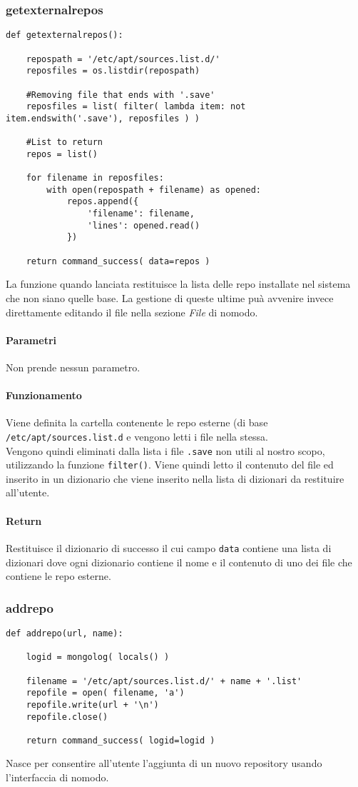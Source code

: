\documentclass[11pt]{article}
\begin{document}
\subsubsection{getexternalrepos}\label{getexternalrepos}
\begin{lstlisting}
def getexternalrepos():

    repospath = '/etc/apt/sources.list.d/'
    reposfiles = os.listdir(repospath)

    #Removing file that ends with '.save'
    reposfiles = list( filter( lambda item: not item.endswith('.save'), reposfiles ) )

    #List to return
    repos = list()

    for filename in reposfiles:
        with open(repospath + filename) as opened:
            repos.append({
                'filename': filename,
                'lines': opened.read()
            })

    return command_success( data=repos )
\end{lstlisting}
La funzione quando lanciata restituisce la lista delle repo installate nel sistema che non siano quelle base. La gestione
di queste ultime puà avvenire invece direttamente editando il file nella sezione \textit{File} di nomodo.
\paragraph{Parametri}
Non prende nessun parametro.
\paragraph{Funzionamento}
Viene definita la cartella contenente le repo esterne (di base \texttt{/etc/apt/sources.list.d} e vengono letti i file
nella stessa.\\
Vengono quindi eliminati dalla lista i file \texttt{.save} non utili al nostro scopo, utilizzando la funzione \texttt{filter()}.
Viene quindi letto il contenuto del file ed inserito in un dizionario che viene inserito nella lista di dizionari da restituire
all'utente.
\paragraph{Return}
Restituisce il dizionario di successo il cui campo \texttt{data} contiene una lista di dizionari dove ogni dizionario contiene
il nome e il contenuto di uno dei file che contiene le repo esterne.

\subsubsection{addrepo}\label{addrepo}
\begin{lstlisting}
def addrepo(url, name):

    logid = mongolog( locals() )

    filename = '/etc/apt/sources.list.d/' + name + '.list'
    repofile = open( filename, 'a')
    repofile.write(url + '\n')
    repofile.close()

    return command_success( logid=logid )
\end{lstlisting}
Nasce per consentire all'utente l'aggiunta di un nuovo repository usando l'interfaccia di nomodo.
\end{document}
